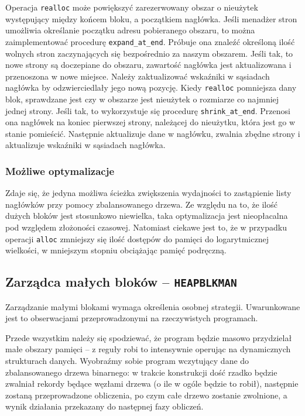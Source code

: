 \documentclass[12pt,a4paper,titlepage,twoside]{mwart}
\begin{document}
Operacja \verb+realloc+ może powiększyć zarezerwowany obszar o nieużytek
występujący między końcem bloku, a początkiem nagłówka. Jeśli menadżer stron
umożliwia określanie początku adresu pobieranego obszaru, to można
zaimplementować procedurę \verb+expand_at_end+. Próbuje ona znaleźć określoną
ilość wolnych stron zaczynających się bezpośrednio za naszym obszarem. Jeśli
tak, to nowe strony są doczepiane do obszaru, zawartość nagłówka jest
aktualizowana i przenoszona w nowe miejsce. Należy zaktualizować wskaźniki w
sąsiadach nagłówka by odzwierciedlały jego nową pozycję. Kiedy \verb+realloc+
pomniejsza dany blok, sprawdzane jest czy w obszarze jest nieużytek o rozmiarze
co najmniej jednej strony. Jeśli tak, to wykorzystuje się procedurę
\verb+shrink_at_end+. Przenosi ona nagłówek na koniec pierwszej strony,
należącej do nieużytku, która jest go w stanie pomieścić. Następnie aktualizuje
dane w nagłówku, zwalnia zbędne strony i aktualizuje wskaźniki w sąsiadach
nagłówka.

\subsubsection{Możliwe optymalizacje}

Zdaje się, że jedyna możliwa ścieżka zwiększenia wydajności to zastąpienie
listy nagłówków przy pomocy zbalansowanego drzewa. Ze względu na to, że ilość
dużych bloków jest stosunkowo niewielka, taka optymalizacja jest nieopłacalna
pod względem złożoności czasowej. Natomiast ciekawe jest to, że w przypadku
operacji \verb+alloc+ zmniejszy się ilość dostępów do pamięci do logarytmicznej
wielkości, w mniejszym stopniu obciążając pamięć podręczną.

\newpage

\subsection{Zarządca małych bloków -- \texttt{HEAPBLKMAN}}

Zarządzanie małymi blokami wymaga określenia osobnej strategii. Uwarunkowane
jest to obserwacjami przeprowadzonymi na rzeczywistych programach.

Przede wszystkim należy się spodziewać, że program będzie masowo przydzielał
małe obszary pamięci -- z reguły robi to intensywnie operując na dynamicznych
strukturach danych. Wyobraźmy sobie program wczytujący dane do zbalansowanego
drzewa binarnego: w trakcie konstrukcji dość rzadko będzie zwalniał rekordy
będące węzłami drzewa (o ile w ogóle będzie to robił), następnie zostaną
przeprowadzone obliczenia, po czym całe drzewo zostanie zwolnione, a wynik
działania przekazany do następnej fazy obliczeń.
\end{document}
